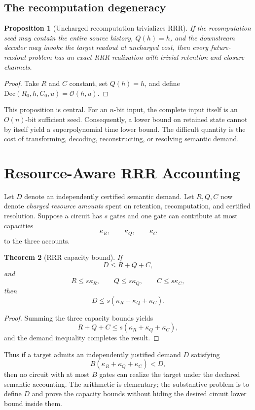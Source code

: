 \documentclass[11pt]{article}
\newtheorem{theorem}{Theorem}[section]
\newtheorem{proposition}[theorem]{Proposition}
\newcommand{\Readout}{\mathcal{O}}
\begin{document}
\subsection{The recomputation degeneracy}

\begin{proposition}[Uncharged recomputation trivializes RRR]
If the recomputation seed may contain the entire source history, $Q(h)=h$, and the downstream decoder may invoke the target readout at uncharged cost, then every future-readout problem has an exact RRR realization with trivial retention and closure channels.
\end{proposition}
\begin{proof}
Take $R$ and $C$ constant, set $Q(h)=h$, and define $\mathrm{Dec}(R_0,h,C_0,u)=\Readout(h,u)$.
\end{proof}

This proposition is central. For an $n$-bit input, the complete input itself is an $O(n)$-bit sufficient seed. Consequently, a lower bound on retained state cannot by itself yield a superpolynomial time lower bound. The difficult quantity is the cost of transforming, decoding, reconstructing, or resolving semantic demand.

\section{Resource-Aware RRR Accounting}

Let $D$ denote an independently certified semantic demand. Let $R,Q,C$ now denote \emph{charged resource amounts} spent on retention, recomputation, and certified resolution. Suppose a circuit has $s$ gates and one gate can contribute at most capacities
\[
\kappa_R,\qquad \kappa_Q,\qquad \kappa_C
\]
to the three accounts.

\begin{theorem}[RRR capacity bound]
If
\[
D\le R+Q+C,
\]
and
\[
R\le s\kappa_R,\qquad
Q\le s\kappa_Q,\qquad
C\le s\kappa_C,
\]
then
\[
\boxed{
D\le s(\kappa_R+\kappa_Q+\kappa_C).
}
\]
\end{theorem}
\begin{proof}
Summing the three capacity bounds yields
\[
R+Q+C\le s(\kappa_R+\kappa_Q+\kappa_C),
\]
and the demand inequality completes the result.
\end{proof}

Thus if a target admits an independently justified demand $D$ satisfying
\[
B(\kappa_R+\kappa_Q+\kappa_C)<D,
\]
then no circuit with at most $B$ gates can realize the target under the declared semantic accounting. The arithmetic is elementary; the substantive problem is to define $D$ and prove the capacity bounds without hiding the desired circuit lower bound inside them.
\end{document}
